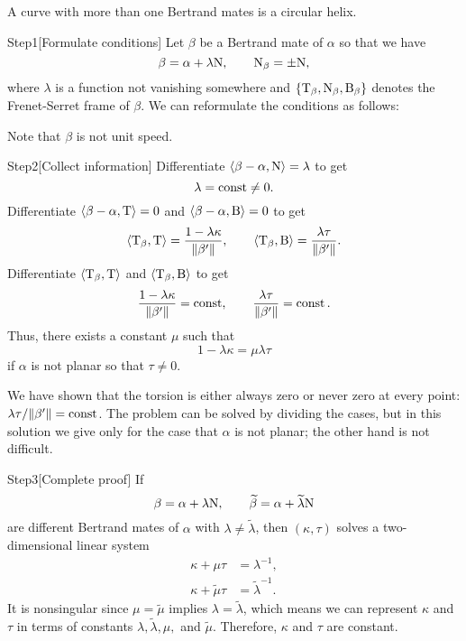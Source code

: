 \documentclass{../../large}
\def\a{\alpha}
\def\Step{Step}
\begin{document}
\begin{prb}
A curve with more than one Bertrand mates is a circular helix.
\end{prb}
\begin{sol}
\Step{1}[Formulate conditions]
Let $\beta$ be a Bertrand mate of $\a$ so that we have
\[\beta=\a+\lambda\rN,\qquad\rN_\beta=\pm\rN,\]
where $\lambda$ is a function not vanishing somewhere and $\{\mathrm{T}_\beta,\mathrm{N}_\beta,\mathrm{B}_\beta\}$ denotes the Frenet-Serret frame of $\beta$.
We can reformulate the conditions as follows:
\iffalse
\begin{cd}[cells={text width=60pt, align=center}]
\<\beta-\a,\rT\>=0 \ar{r}\ar{d}& \<\beta-\a,\rN\>=\lambda \ar{r}\ar{l}\ar{d}& \<\beta-\a,\rB\>=0 \ar{l}\ar{d} \\
\<\rT_\beta,\rT\>=? \ar{r}\ar{d}& \<\rT_\beta,\rN\>=0 \ar{r}\ar{l}\ar{d}& \<\rT_\beta,\rB\>=? \ar{l}\ar{d} \\
\<\rN_\beta,\rT\>=0 \ar{r}& \<\rN_\beta,\rN\>=\pm1 \ar{r}\ar{l}& \<\rN_\beta,\rB\>=0 \ar{l}.
\end{cd}
\fi
Note that $\beta$ is not unit speed.

\Step{2}[Collect information]
Differentiate $\<\beta-\a,\rN\>=\lambda$ to get
\[\lambda=\operatorname{const}\ne0.\]
Differentiate $\<\beta-\a,\rT\>=0$ and $\<\beta-\a,\rB\>=0$ to get
\[\langle\mathrm{T}_\beta,\mathrm{T}\rangle=\frac{1-\lambda\kappa}{\|\beta'\|},\qquad\langle\mathrm{T}_\beta,\mathrm{B}\rangle=\frac{\lambda\tau}{\|\beta'\|}.\]
Differentiate $\langle\mathrm{T}_\beta,\mathrm{T}\rangle$ and $\langle\mathrm{T}_\beta,\mathrm{B}\rangle$ to get
\[\frac{1-\lambda\kappa}{\|\beta'\|}=\operatorname{const},\qquad\frac{\lambda\tau}{\|\beta'\|}=\operatorname{const}.\]
Thus, there exists a constant $\mu$ such that
\[1-\lambda\kappa=\mu\lambda\tau\]
if $\a$ is not planar so that $\tau\ne0$.

We have shown that the torsion is either always zero or never zero at every point: $\lambda\tau/\|\beta'\|=\operatorname{const}$.
The problem can be solved by dividing the cases, but in this solution we give only for the case that $\a$ is not planar; the other hand is not difficult.

\Step{3}[Complete proof]
If
\[\beta=\a+\lambda\rN,\qquad\tilde\beta=\a+\tilde\lambda\rN\]
are different Bertrand mates of $\a$ with $\lambda\ne\tilde\lambda$, then $(\kappa,\tau)$ solves a two-dimensional linear system
\begin{align*}
\kappa+\mu\tau&=\lambda^{-1},\\
\kappa+\tilde\mu\tau&=\tilde\lambda^{-1}.
\end{align*}
It is nonsingular since $\mu=\tilde\mu$ implies $\lambda=\tilde\lambda$, which means we can represent $\kappa$ and $\tau$ in terms of constants $\lambda,\tilde\lambda,\mu,$ and $\tilde\mu$.
Therefore, $\kappa$ and $\tau$ are constant.
\end{sol}
\end{document}
